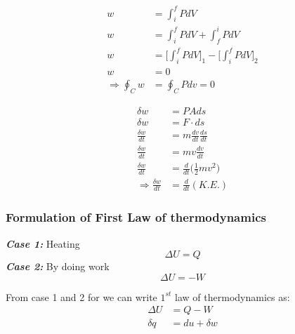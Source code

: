 \documentclass[fleqn,10pt]{SelfArx} %
\begin{document}
\begin{align}
    w &= \int_i^f PdV \\
    w &= \int_i^f PdV + \int_f^i PdV \\
    w &= \Big[\int_i^f PdV\Big]_1 - \Big[\int_i^f PdV \Big]_2 \\
    w &= 0 \\
    \Rightarrow \oint_C w &= \oint_C Pdv = 0
\end{align}

\begin{align}
    \delta w &= PAds \\
    \delta w &= F\cdot ds \\ 
    \displaystyle\frac{\delta w}{dt} &= m \frac{dv}{dt} \frac{ds}{dt} \\ 
    \frac{\delta w}{dt} &= mv\frac{dv}{dt} \\ 
    \frac{\delta w}{dt} &= \frac{d}{dt} \Big( \displaystyle\frac{1}{2} mv^2 \Big) \\
    \Rightarrow \frac{\delta w}{dt} &= \frac{d}{dt} (K.E.)
\end{align}

\subsubsection*{Formulation of First Law of thermodynamics}

\textbf{\textit{Case 1:}} Heating
        $$\Delta U = Q$$
\textbf{\textit{Case 2:}} By doing work
        $$\Delta U = -W$$

From case 1 and 2 for we can write $1^{st}$ law of thermodynamics as:
\begin{align}
    \Delta U &= Q - W \\
    \delta q &= du + \delta w
\end{align}

\begin{center}
\end{center}
\end{document}
